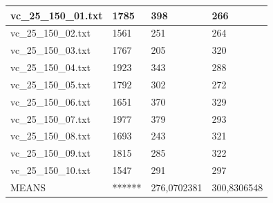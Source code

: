 \documentclass[11pt]{article}
\begin{document}
\begin{table}[!ht]
\begin{tabular}{|l|l|l|l|}
        vc\_25\_150\_01.txt & 1785 & 398 & 266 \\ \hline
        vc\_25\_150\_02.txt & 1561 & 251 & 264 \\ \hline
        vc\_25\_150\_03.txt & 1767 & 205 & 320 \\ \hline
        vc\_25\_150\_04.txt & 1923 & 343 & 288 \\ \hline
        vc\_25\_150\_05.txt & 1792 & 302 & 272 \\ \hline
        vc\_25\_150\_06.txt & 1651 & 370 & 329 \\ \hline
        vc\_25\_150\_07.txt & 1977 & 379 & 293 \\ \hline
        vc\_25\_150\_08.txt & 1693 & 243 & 321 \\ \hline
        vc\_25\_150\_09.txt & 1815 & 285 & 322 \\ \hline
        vc\_25\_150\_10.txt & 1547 & 291 & 297 \\ \hline
        MEANS & ****** & 276,0702381 & 300,8306548 \\ \hline
    \end{tabular}
\end{table}
\end{document}
